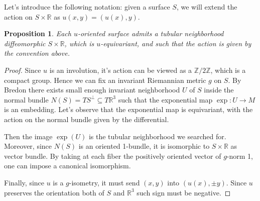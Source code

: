 \documentclass[a4paper, 11pt]{amsart}
\theoremstyle{plain}
\newtheorem{prop}{Proposition}[section]
\theoremstyle{definition}
\newcommand{\R}{\mathbb{R}}
\newcommand{\Z}{\mathbb{Z}}
\begin{document}
Let's introduce the following notation: given a surface $S$, we will extend the action on $S \times \R$ as $u(x,y) = (u(x), y)$.
\begin{prop}\label{tubsurf}
	Each $u$-oriented surface admits a tubular neighborhood diffeomorphic $S \times \R$, which is $u$-equivariant, and such that the action is given by the convention above.
\end{prop}
\begin{proof}
	Since $u$ is an involution, it's action can be viewed as a $\Z/2\Z$, which is a compact group. Hence we can fix an invariant Riemannian metric $g$ on $S$. By Bredon \cite[Thm.\ 2.2]{bredonIntroductonCompactTransformation1972} there exists small enough invariant neighborhood $U$ of $S$ inside the normal bundle $N(S) = TS^\bot \subseteq T\R^3$ such that the exponential map $\exp \colon U \to M$ is an embedding. Let's observe that the exponential map is equivariant, with the action on the normal bundle given by the differential.
	
	Then the image $\exp(U)$ is the tubular neighborhood we searched for. Moreover, since $N(S)$ is an oriented 1-bundle, it is isomorphic to $S \times \R$ as vector bundle. By taking at each fiber the positively oriented vector of $g$-norm 1, one can impose a canonical isomorphism.
	
	Finally, since $u$ is a $g$-isometry, it must send $(x,y)$ into $(u(x),\pm y)$. Since $u$ preserves the orientation both of $S$ and $\R^3$ such sign must be negative.
\end{proof}
\end{document}
